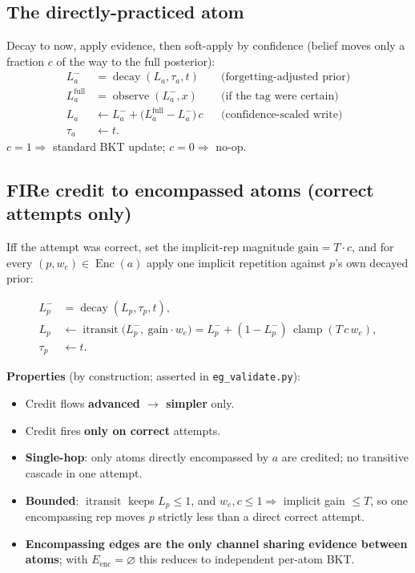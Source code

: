 \documentclass[11pt]{article}
\newcommand{\Enc}{\operatorname{Enc}}
\newcommand{\clamp}{\operatorname{clamp}}
\newcommand{\itransit}{\operatorname{itransit}}
\begin{document}
\subsection{The directly-practiced atom}
Decay to now, apply evidence, then soft-apply by confidence (belief moves only a
fraction $c$ of the way to the full posterior):
\[
\begin{aligned}
L^{-}_a &= \operatorname{decay}(L_a,\tau_a,t) &&\text{(forgetting-adjusted prior)}\\
L^{\mathrm{full}}_a &= \operatorname{observe}(L^{-}_a,x) &&\text{(if the tag were certain)}\\
L_a &\leftarrow L^{-}_a + \big(L^{\mathrm{full}}_a-L^{-}_a\big)\,c &&\text{(confidence-scaled write)}\\
\tau_a &\leftarrow t .
\end{aligned}
\]
$c=1\Rightarrow$ standard BKT update; $c=0\Rightarrow$ no-op.

\subsection{FIRe credit to encompassed atoms (correct attempts only)}
Iff the attempt was correct, set the implicit-rep magnitude
$\mathrm{gain}=T\cdot c$, and for every $(p,w_e)\in\Enc(a)$ apply one implicit
repetition against $p$'s own decayed prior:
\begin{keybox}
\[
\begin{aligned}
L^{-}_p &= \operatorname{decay}(L_p,\tau_p,t),\\
L_p &\leftarrow \itransit\!\big(L^{-}_p,\ \mathrm{gain}\cdot w_e\big)
   = L^{-}_p + (1-L^{-}_p)\,\clamp(T\,c\,w_e),\\
\tau_p &\leftarrow t .
\end{aligned}
\]
\end{keybox}

\noindent\textbf{Properties} (by construction; asserted in
\texttt{eg\_validate.py}):
\begin{itemize}[leftmargin=1.4em,itemsep=1pt]
  \item Credit flows \textbf{advanced $\to$ simpler} only.
  \item Credit fires \textbf{only on correct} attempts.
  \item \textbf{Single-hop}: only atoms directly encompassed by $a$ are credited;
  no transitive cascade in one attempt.
  \item \textbf{Bounded}: $\itransit$ keeps $L_p\le1$, and $w_e,c\le1\Rightarrow$
  implicit gain $\le T$, so one encompassing rep moves $p$ strictly less than a
  direct correct attempt.
  \item \textbf{Encompassing edges are the only channel sharing evidence between
  atoms}; with $E_{\mathrm{enc}}=\varnothing$ this reduces to independent
  per-atom BKT.
\end{itemize}
\end{document}
